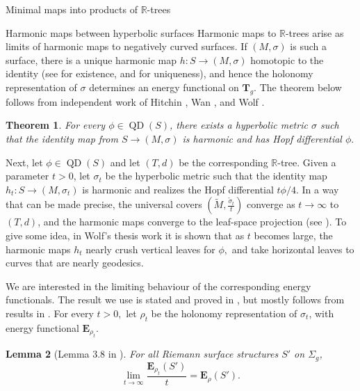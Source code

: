 \documentclass[10pt]{amsart}
\newcommand{\R}{\mathbb R}
\newtheorem{thm}{Theorem}[section]
\newtheorem{lem}[thm]{Lemma}
\DeclareMathOperator{\QD}{\textrm{QD}}
\theoremstyle{definition}
\begin{document}
\begin{section}{Minimal maps into products of $\R$-trees}
\begin{subsection}{Harmonic maps between hyperbolic surfaces}
Harmonic maps to $\R$-trees arise as limits of harmonic maps to negatively curved surfaces. If $(M,\sigma)$ is such a surface, there is a unique harmonic map $h:S\to (M,\sigma)$ homotopic to the identity (see \cite{ES} for existence, and \cite[Theorem H]{Har} for uniqueness), and hence the holonomy representation of $\sigma$ determines an energy functional on $\mathbf{T}_g.$ The theorem below follows from independent work of Hitchin \cite{Hi}, Wan \cite{Wan}, and Wolf \cite{Wthesis}.
\begin{thm}
    For every $\phi\in \QD(S)$, there exists a hyperbolic metric $\sigma$ such that the identity map from $S\to (M,\sigma)$ is harmonic and has Hopf differential $\phi.$
\end{thm}
Next, let $\phi\in \QD(S)$ and let $(T,d)$ be the corresponding $\R$-tree. Given a parameter $t>0$, let $\sigma_t$ be the hyperbolic metric such that the identity map $h_t: S\to (M,\sigma_t)$ is harmonic and realizes the Hopf differential $t\phi/4$. In a way that can be made precise, the universal covers $(\tilde{M},\frac{\tilde{\sigma}_t}{t})$ converge as $t\to \infty$ to $(T,d)$, and the harmonic maps converge to the leaf-space projection (see \cite{W}). 
To give some idea, in Wolf's thesis work \cite{Wthesis} it is shown that as $t$ becomes large, the harmonic maps $h_t$ nearly crush vertical leaves for $\phi,$ and take horizontal leaves to curves that are nearly geodesics.

We are interested in the limiting behaviour of the corresponding energy functionals. The result we use is stated and proved in \cite{MSS}, but mostly follows from results in \cite{Wthesis}. For every $t>0,$ let $\rho_t$ be the holonomy representation of $\sigma_t$, with energy functional $\mathbf{E}_{\rho_t}.$
\begin{lem}[Lemma 3.8 in \cite{MSS}]\label{conv}
For all Riemann surface structures $S'$ on $\Sigma_g$, 
$$\lim_{t\to \infty} \frac{\mathbf{E}_{\rho_t}(S')}{t} =\mathbf{E}_\rho(S').$$
\end{lem}


\end{subsection}
\end{section}
\end{document}
